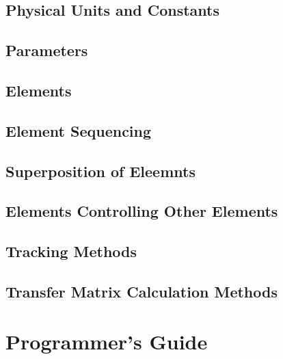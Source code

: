 \documentclass{book}
\begin{document}
\chapter{Physical Units and Constants}

\chapter{Parameters}

\chapter{Elements}

\chapter{Element Sequencing}

\chapter{Superposition of Eleemnts}

\chapter{Elements Controlling Other Elements}

\chapter{Tracking Methods}

\chapter{Transfer Matrix Calculation Methods}

\part{Programmer's Guide}
\end{document}
